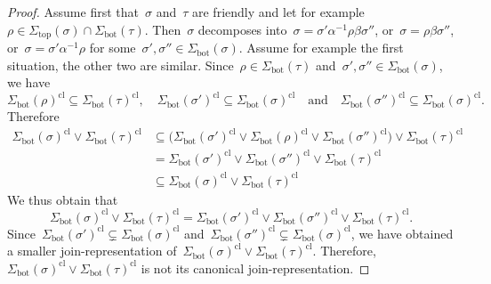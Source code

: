 \documentclass{memo-l}
\theoremstyle{definition}
\renewcommand{\top}{\mathrm{top}} %
\newcommand{\bottom}{\mathrm{bot}} %
\newcommand{\join}{\vee} %
\newcommand{\closure}[1]{#1^{\mathrm{cl}}} %
\begin{document}
\begin{proof}
Assume first that~$\sigma$ and~$\tau$ are friendly and let for example ${\rho \in \Sigma_\top(\sigma) \cap \Sigma_\bottom(\tau)}$.
Then~$\sigma$ decomposes into~$\sigma = \sigma' \alpha^{-1} \rho \beta \sigma''$, or~$\sigma = \rho \beta \sigma''$, or~$\sigma = \sigma' \alpha^{-1} \rho$ for some~$\sigma', \sigma'' \in \Sigma_\bottom(\sigma)$.
Assume for example the first situation, the other two are similar.
Since~$\rho \in \Sigma_\bottom(\tau)$ and~$\sigma', \sigma'' \in \Sigma_\bottom(\sigma)$, we have
\[
\closure{\Sigma_\bottom(\rho)} \subseteq \closure{\Sigma_\bottom(\tau)},
\quad
\closure{\Sigma_\bottom(\sigma')} \subseteq \closure{\Sigma_\bottom(\sigma)}
\quad\text{and}\quad
\closure{\Sigma_\bottom(\sigma'')} \subseteq \closure{\Sigma_\bottom(\sigma)}.
\]
Therefore
\begin{align*}
\closure{\Sigma_\bottom(\sigma)} \join \closure{\Sigma_\bottom(\tau)}
& \subseteq \big( \closure{\Sigma_\bottom(\sigma')} \join \closure{\Sigma_\bottom(\rho)} \join \closure{\Sigma_\bottom(\sigma'')} \big) \join \closure{\Sigma_\bottom(\tau)} \\
& = \closure{\Sigma_\bottom(\sigma')} \join \closure{\Sigma_\bottom(\sigma'')} \join \closure{\Sigma_\bottom(\tau)} \\
& \subseteq \closure{\Sigma_\bottom(\sigma)} \join \closure{\Sigma_\bottom(\tau)}
\end{align*}
We thus obtain that
\[
\closure{\Sigma_\bottom(\sigma)} \join \closure{\Sigma_\bottom(\tau)} = \closure{\Sigma_\bottom(\sigma')} \join \closure{\Sigma_\bottom(\sigma'')} \join \closure{\Sigma_\bottom(\tau)}.
\]
Since~$\closure{\Sigma_\bottom(\sigma')} \subsetneq \closure{\Sigma_\bottom(\sigma)}$ and~$\closure{\Sigma_\bottom(\sigma'')} \subsetneq \closure{\Sigma_\bottom(\sigma)}$, we have obtained a smaller join-represen\-tation of~$\closure{\Sigma_\bottom(\sigma)} \join \closure{\Sigma_\bottom(\tau)}$. Therefore,~$\closure{\Sigma_\bottom(\sigma)} \join \closure{\Sigma_\bottom(\tau)}$ is not its canonical join-representation.


\end{proof}
\end{document}
